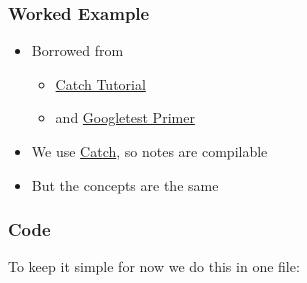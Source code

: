 \subsubsection{Worked Example}\label{worked-example}

\begin{itemize}
\itemsep1pt\parskip0pt
\item
  Borrowed from

  \begin{itemize}
  \itemsep1pt\parskip0pt
  \item
    \href{https://github.com/philsquared/Catch/blob/master/docs/tutorial.md}{Catch
    Tutorial}
  \item
    and
    \href{https://code.google.com/p/googletest/wiki/V1_7_Primer}{Googletest
    Primer}
  \end{itemize}
\item
  We use \href{https://github.com/philsquared/Catch}{Catch}, so notes
  are compilable
\item
  But the concepts are the same
\end{itemize}

\subsubsection{Code}\label{code}

To keep it simple for now we do this in one file:

\begin{Shaded}
\begin{Highlighting}[]

    
      
\NormalTok{\}}

\NormalTok{, } \NormalTok{) \{}
    \NormalTok{) == } \NormalTok{);}
    \NormalTok{) == } \NormalTok{);}
    \NormalTok{) == } \NormalTok{);}
    \NormalTok{) == } \NormalTok{);}
\NormalTok{\}}
\end{Highlighting}
\end{Shaded}

